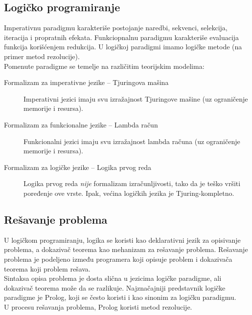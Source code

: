 \documentclass[../main.tex]{subfiles}
\begin{document}
\begin{boxnaslovi}
\section{Logičko programiranje}
\end{boxnaslovi}

Imperativnu paradigmu karakteriše postojanje naredbi, sekvenci, selekcija, iteracija i propratnih efekata. Funkciopnalnu paradigmu karakteriše evaluacija funkcija korišćenjem redukcija. U logičkoj paradigmi imamo logičke metode (na primer metod rezolucije).
\\
Pomenute paradigme se temelje na različitim teorijskim modelima:
\begin{description}

\item[Formalizam za imperativne jezike -- Tjuringova mašina] \hfill

	Imperativni jezici imaju svu izražajnost Tjuringove mašine (uz ograničenje memorije i resursa).

\item[Formalizam za funkcionalne jezike -- Lambda račun] \hfill

	Funkcionalni jezici imaju svu izražajnost lambda računa (uz ograničenje memorije i resursa).
	
\item[Formalizam za logičke jezike -- Logika prvog reda] \hfill

	Logika prvog reda {\it nije} formalizam izračunljivosti, tako da je teško vršiti poređenje ove vrste. Ipak, većina logičkih jezika je Tjuring-kompletno.
\end{description}

\subsection{Rešavanje problema}

U logičkom programiranju, logika se koristi kao deklarativni jezik za opisivanje problema, a dokazivač teorema kao mehanizam za rešavanje problema. Rešavanje problema je podeljeno između programera koji opisuje problem i dokazivača teorema koji problem rešava.
\\
Sintaksa opisa problema je dosta slična u jezicima logičke paradigme, ali dokazivač teorema može da se razlikuje. Najznačajniji predstavnik logičke paradigme je Prolog, koji se često koristi i kao sinonim za logičku paradigmu.
\\
U procesu rešavanja problema, Prolog koristi metod rezolucije.
\end{document}
